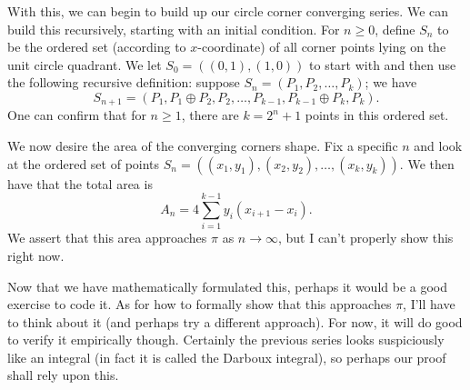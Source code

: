 \documentclass{article}
\begin{document}
With this, we can begin to build up our circle corner converging series. We can
build this recursively, starting with an initial condition. For \( n \geqslant
0 \), define \( S_n \) to be the ordered set (according to \( x \)-coordinate)
of all corner points lying on the unit circle quadrant. We let \( S_0 = \left(
\left( 0, 1 \right), \left( 1, 0 \right) \right) \) to start with and then use
the following recursive definition: suppose \( S_n = \left( P_1, P_2, \ldots,
P_k \right) \); we have
\[
    S_{n+1} = \left( P_1, P_1 \oplus P_2, P_2, \ldots, P_{k-1}, P_{k - 1} \oplus P_k, P_k \right)
.\]
One can confirm that for \( n \geqslant 1 \), there are \( k = 2^n + 1 \) points in
this ordered set.

We now desire the area of the converging corners shape. Fix a specific \( n \)
and look at the ordered set of points \( S_n = \left( \left( x_1, y_1 \right),
\left( x_2, y_2 \right), \ldots, \left( x_k, y_k \right) \right) \). We then
have that the total area is
\[
    A_n = 4 \sum_{i = 1}^{k - 1} y_i \left( x_{i + 1} - x_i \right)
.\]
We assert that this area approaches \( \pi \) as \( n \to \infty \), but I
can't properly show this right now.

Now that we have mathematically formulated this, perhaps it would be a good
exercise to code it. As for how to formally show that this approaches \( \pi
\), I'll have to think about it (and perhaps try a different approach). For
now, it will do good to verify it empirically though. Certainly the previous
series looks suspiciously like an integral (in fact it is called the Darboux
integral), so perhaps our proof shall rely upon this.
\end{document}
